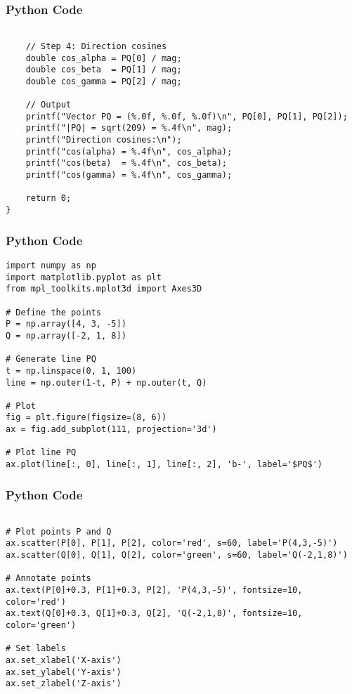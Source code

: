 \documentclass{beamer}
\begin{document}
\begin{frame}[fragile]
    \frametitle{Python Code}
    \begin{lstlisting}
    
    // Step 4: Direction cosines
    double cos_alpha = PQ[0] / mag;
    double cos_beta  = PQ[1] / mag;
    double cos_gamma = PQ[2] / mag;

    // Output
    printf("Vector PQ = (%.0f, %.0f, %.0f)\n", PQ[0], PQ[1], PQ[2]);
    printf("|PQ| = sqrt(209) = %.4f\n", mag);
    printf("Direction cosines:\n");
    printf("cos(alpha) = %.4f\n", cos_alpha);
    printf("cos(beta)  = %.4f\n", cos_beta);
    printf("cos(gamma) = %.4f\n", cos_gamma);

    return 0;
}

    \end{lstlisting}
\end{frame}

\begin{frame}[fragile]
    \frametitle{Python Code}
    \begin{lstlisting}
import numpy as np
import matplotlib.pyplot as plt
from mpl_toolkits.mplot3d import Axes3D

# Define the points
P = np.array([4, 3, -5])
Q = np.array([-2, 1, 8])

# Generate line PQ
t = np.linspace(0, 1, 100)
line = np.outer(1-t, P) + np.outer(t, Q)

# Plot
fig = plt.figure(figsize=(8, 6))
ax = fig.add_subplot(111, projection='3d')

# Plot line PQ
ax.plot(line[:, 0], line[:, 1], line[:, 2], 'b-', label='$PQ$')

    \end{lstlisting}
\end{frame}

\begin{frame}[fragile]
    \frametitle{Python Code}
    \begin{lstlisting}
    
# Plot points P and Q
ax.scatter(P[0], P[1], P[2], color='red', s=60, label='P(4,3,-5)')
ax.scatter(Q[0], Q[1], Q[2], color='green', s=60, label='Q(-2,1,8)')

# Annotate points
ax.text(P[0]+0.3, P[1]+0.3, P[2], 'P(4,3,-5)', fontsize=10, color='red')
ax.text(Q[0]+0.3, Q[1]+0.3, Q[2], 'Q(-2,1,8)', fontsize=10, color='green')

# Set labels
ax.set_xlabel('X-axis')
ax.set_ylabel('Y-axis')
ax.set_zlabel('Z-axis')

    \end{lstlisting}
\end{frame}
\end{document}
